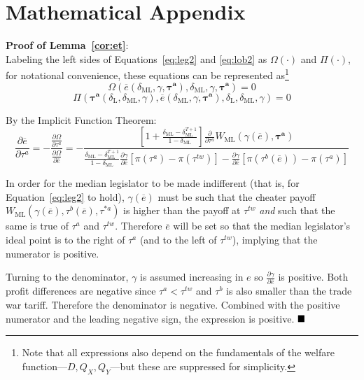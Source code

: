 \documentclass[authoryear, review]{elsarticle}
\newcommand{\ov}{\overline}
\newcommand{\bta}{\bm{\tau^a}}
\newcommand{\ga}{\gamma}
\newcommand{\de}{\delta}
\begin{document}
\section{Mathematical Appendix}
\noindent \textbf{\hypertarget{Cor_et}{Proof of Lemma~\ref{cor:et}}}: \\
Labeling the left sides of Equations~\ref{eq:leg2} and \ref{eq:lob2} as $\Omega\left(\cdot\right)$ and $\Pi\left(\cdot\right)$, for notational convenience, these equations can be represented as\footnote{Note that all expressions also depend on the fundamentals of the welfare function---$D,Q_X,Q_Y$---but these are suppressed for simplicity.}
\begin{equation}
  \Omega\left(\ov{e}\left(\de_\text{ML},\ga,\bta \right),\de_\text{ML},\ga,\bta \right) = 0
	\label{eq:leg3}
\end{equation}
\begin{equation}
  \Pi\left(\bta\left(\de_\text{L},\de_\text{ML},\ga\right),\ov{e}\left(\de_\text{ML},\ga,\bta\right),\de_\text{L},\de_\text{ML},\ga \right) = 0
  \label{eq:lob3}
\end{equation}


By the Implicit Function Theorem:
\begin{equation}
 	\frac{\partial \ov{e}}{\partial \tau^a} = -\frac{\frac{\partial \Omega}{\partial \tau^a}}{\frac{\partial \Omega}{\partial \ov{e}}} = -
	\textstyle \frac{\left[1+ \frac{\de_\text{ML} - \de_\text{ML}^{T+1}}{1-\de_\text{ML}}  \right]\frac{\partial}{\partial \tau^a}W_\text{ML}(\ga(\ov{e}),\bta)} {\frac{\de_\text{ML} - \de_\text{ML}^{T+1}}{1-\de_\text{ML}}\frac{\partial \ga}{\partial \ov{e}}\left[ \pi(\tau^a) - \pi(\tau^{tw}) \right] - \frac{\partial \ga}{\partial \ov{e}}\left[ \pi(\tau^b(\ov{e})) - \pi(\tau^{a}) \right]}
	\label{eq:coret}
\end{equation}

\noindent In order for the median legislator to be made indifferent (that is, for Equation~\ref{eq:leg2} to hold), $\ga(\ov{e})$ must be such that the cheater payoff $W_\text{ML}(\ga(\ov{e}),\tau^b(\ov{e}),\tau^{*a})$ is higher than the payoff at $\tau^{tw}$ \textit{and} such that the same is true of $\tau^a$ and $\tau^{tw}$. Therefore $\ov{e}$ will be set so that the median legislator's ideal point is to the right of $\tau^a$ (and to the left of $\tau^{tw}$), implying that the numerator is positive.

Turning to the denominator, $\ga$ is assumed increasing in $e$ so $\frac{\partial \ga}{\partial \ov{e}}$ is positive. Both profit differences are negative since $\tau^a < \tau^{tw}$ and $\tau^b$ is also smaller than the trade war tariff. Therefore the denominator is negative. Combined with the positive numerator and the leading negative sign, the expression is positive. $\hfill\blacksquare$
\end{document}
